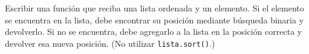 \begin{ejercicio}
Escribir una función que reciba una lista ordenada y un elemento. Si el
elemento se encuentra en la lista, debe encontrar su posición mediante
búsqueda binaria y devolverlo.  Si no se encuentra, debe agregarlo a la
lista en la posición correcta y devolver esa nueva posición. (No utilizar
\verb!lista.sort()!.)
\end{ejercicio}

